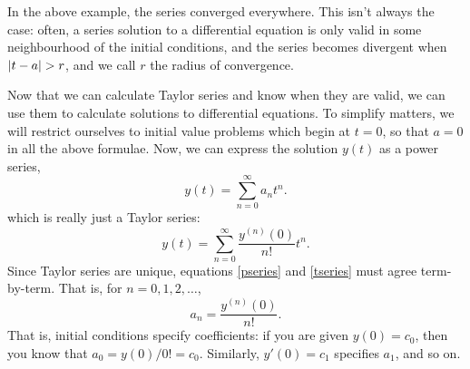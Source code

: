 \documentclass[12pt]{book}
\begin{document}
In the above example, the series converged everywhere. This isn't always
the case: often, a series solution to a differential equation is only
valid in some neighbourhood of the initial conditions, and the series
becomes divergent when $\left|t-a\right| > r$, and we call $r$ the radius of
convergence.

%

Now that we can calculate Taylor series and know when they are valid,
we can use them to calculate solutions to differential equations. To
simplify matters, we will restrict ourselves to initial value problems
which begin at $t=0$, so that $a=0$ in all the above formulae. Now, we
can express the solution $y(t)$ as a power series,
\begin{dmath}
  \label{pseries}
  y(t) = \sum_{n=0}^\infty a_n t^n .
\end{dmath}
which is really just a Taylor series:
\begin{dmath}
  \label{tseries}
  y(t) = \sum_{n=0}^\infty \frac{y^{(n)}(0)}{n!} t^n .
\end{dmath}
Since Taylor series are unique, equations \eqref{pseries} and
\eqref{tseries} must agree term-by-term.  That is, for $n=0,1,2,\dots$,
\begin{dmath*}
  a_n = \frac{y^{(n)}(0)}{n!}.
\end{dmath*}
That is, initial conditions specify coefficients: if you are given
$y(0)=c_0$, then you know that $a_0 = y(0)/0! = c_0$. Similarly, $y'(0)=c_1$
specifies $a_1$, and so on.
\end{document}
